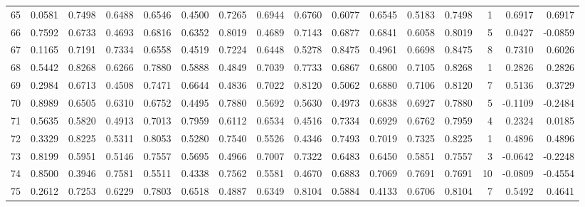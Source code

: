\begin{tabular}{lrrrrrrrrrrrrrrr}
65  &      0.0581 &  0.7498 &  0.6488 &  0.6546 &  0.4500 &  0.7265 &  0.6944 &  0.6760 &  0.6077 &  0.6545 &   0.5183 &     0.7498 &      1 &                    0.6917 &                     0.6917 \\
66  &      0.7592 &  0.6733 &  0.4693 &  0.6816 &  0.6352 &  0.8019 &  0.4689 &  0.7143 &  0.6877 &  0.6841 &   0.6058 &     0.8019 &      5 &                    0.0427 &                    -0.0859 \\
67  &      0.1165 &  0.7191 &  0.7334 &  0.6558 &  0.4519 &  0.7224 &  0.6448 &  0.5278 &  0.8475 &  0.4961 &   0.6698 &     0.8475 &      8 &                    0.7310 &                     0.6026 \\
68  &      0.5442 &  0.8268 &  0.6266 &  0.7880 &  0.5888 &  0.4849 &  0.7039 &  0.7733 &  0.6867 &  0.6800 &   0.7105 &     0.8268 &      1 &                    0.2826 &                     0.2826 \\
69  &      0.2984 &  0.6713 &  0.4508 &  0.7471 &  0.6644 &  0.4836 &  0.7022 &  0.8120 &  0.5062 &  0.6880 &   0.7106 &     0.8120 &      7 &                    0.5136 &                     0.3729 \\
70  &      0.8989 &  0.6505 &  0.6310 &  0.6752 &  0.4495 &  0.7880 &  0.5692 &  0.5630 &  0.4973 &  0.6838 &   0.6927 &     0.7880 &      5 &                   -0.1109 &                    -0.2484 \\
71  &      0.5635 &  0.5820 &  0.4913 &  0.7013 &  0.7959 &  0.6112 &  0.6534 &  0.4516 &  0.7334 &  0.6929 &   0.6762 &     0.7959 &      4 &                    0.2324 &                     0.0185 \\
72  &      0.3329 &  0.8225 &  0.5311 &  0.8053 &  0.5280 &  0.7540 &  0.5526 &  0.4346 &  0.7493 &  0.7019 &   0.7325 &     0.8225 &      1 &                    0.4896 &                     0.4896 \\
73  &      0.8199 &  0.5951 &  0.5146 &  0.7557 &  0.5695 &  0.4966 &  0.7007 &  0.7322 &  0.6483 &  0.6450 &   0.5851 &     0.7557 &      3 &                   -0.0642 &                    -0.2248 \\
74  &      0.8500 &  0.3946 &  0.7581 &  0.5511 &  0.4338 &  0.7562 &  0.5581 &  0.4670 &  0.6883 &  0.7069 &   0.7691 &     0.7691 &     10 &                   -0.0809 &                    -0.4554 \\
75  &      0.2612 &  0.7253 &  0.6229 &  0.7803 &  0.6518 &  0.4887 &  0.6349 &  0.8104 &  0.5884 &  0.4133 &   0.6706 &     0.8104 &      7 &                    0.5492 &                     0.4641 \\

\end{tabular}
